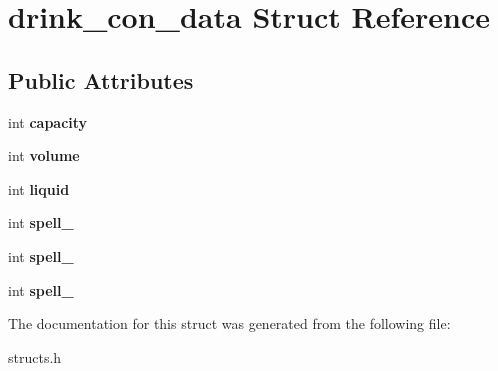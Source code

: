 \hypertarget{structdrink__con__data}{\section{drink\-\_\-con\-\_\-data Struct Reference}
\label{structdrink__con__data}
}
\subsection*{Public Attributes}
\begin{DoxyCompactItemize}
\item 
\hypertarget{structdrink__con__data_a5cac33a25d1cc68b4dac27ade406d684}{int {\bfseries capacity}}\label{structdrink__con__data_a5cac33a25d1cc68b4dac27ade406d684}

\item 
\hypertarget{structdrink__con__data_a686fd202bd3b635278f013bbdc669f4a}{int {\bfseries volume}}\label{structdrink__con__data_a686fd202bd3b635278f013bbdc669f4a}

\item 
\hypertarget{structdrink__con__data_ac33a72581f93b7bad80f3ae33d4ef68c}{int {\bfseries liquid}}\label{structdrink__con__data_ac33a72581f93b7bad80f3ae33d4ef68c}

\item 
\hypertarget{structdrink__con__data_af5145a4345372041e57348562a4bd430}{int {\bfseries spell\-\_}}\label{structdrink__con__data_af5145a4345372041e57348562a4bd430}

\item 
\hypertarget{structdrink__con__data_a8df8caa469e72817b444d23562ba7a26}{int {\bfseries spell\-\_}}\label{structdrink__con__data_a8df8caa469e72817b444d23562ba7a26}

\item 
\hypertarget{structdrink__con__data_ac605d28a87025e7578866f9772cb3509}{int {\bfseries spell\-\_}}\label{structdrink__con__data_ac605d28a87025e7578866f9772cb3509}

\end{DoxyCompactItemize}


The documentation for this struct was generated from the following file\-:\begin{DoxyCompactItemize}
\item 
structs.\-h\end{DoxyCompactItemize}
